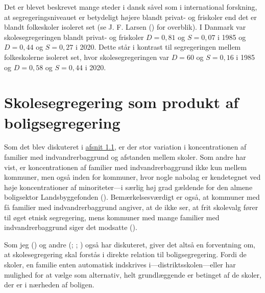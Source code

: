 \documentclass[
]{book}
\begin{document}
Det er blevet beskrevet mange steder i dansk såvel som i international forskning, at segregeringsniveauet er betydeligt højere blandt privat- og friskoler end det er blandt folkeskoler isoleret set (se J. F. Larsen () for overblik). I Danmark var skolesegregeringen blandt privat- og friskoler \(D=0,81\) og \(S=0,07\) i 1985 og \(D=0,44\) og \(S=0,27\) i 2020. Dette står i kontrast til segregeringen mellem folkeskolerne isoleret set, hvor skolesegregeringen var \(D=60\) og \(S=0,16\) i 1985 og \(D=0,58\) og \(S=0,44\) i 2020.

\section{Skolesegregering som produkt af boligsegregering}\label{skolesegregering-som-produkt-af-boligsegregering}

Som det blev diskuteret i \hyperref[det-danske-skolelandskab]{afsnit 1.1}, er der stor variation i koncentrationen af familier med indvandrerbaggrund og afstanden mellem skoler. Som andre har vist, er koncentrationen af familier med indvandrerbaggrund ikke kun mellem kommuner, men også inden for kommuner, hvor nogle nabolag er kendetegnet ved høje koncentrationer af minoriteter---i særlig høj grad gældende for den almene boligsektor Landsbyggefonden (). Bemærkelsesværdigt er også, at kommuner med få familier med indvandrerbaggrund angiver, at de ikke ser, at frit skolevalg fører til øget etnisk segregering, mens kommuner med mange familier med indvandrerbaggrund siger det modsatte ().

Som jeg () og andre (; ; ) også har diskuteret, giver det altså en forventning om, at skolesegregering skal forstås i direkte relation til boligsegregering. Fordi de skoler, en familie enten automatisk indskrives i---distriktsskolen---eller har mulighed for at vælge som alternativ, helt grundlæggende er betinget af de skoler, der er i nærheden af boligen.
\end{document}
